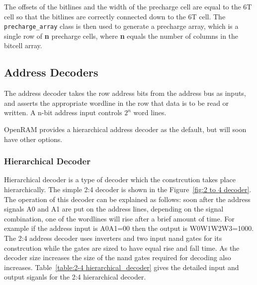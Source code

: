 The offsets of the bitlines and the width of the precharge cell are
equal to the 6T cell so that the bitlines are correctly connected down
to the 6T cell.  The \verb|precharge_array| class is then used to
generate a precharge array, which is a single row of \textbf{n}
precharge cells, where \textbf{n} equals the number of columns in the
bitcell array.


\subsection{Address Decoders}
\label{sec:addressdecoder}

The address decoder takes the row address bits from the address bus as
inputs, and asserts the appropriate wordline in the row that data is
to be read or written.  A n-bit address input controls $2^n$ word
lines. 

OpenRAM provides a hierarchical address decoder as the default, but
will soon have other options.

\subsubsection{Hierarchical Decoder}
\label{sec:hierdecoder}

Hierarchical decoder is a type of decoder which the constrcution takes place hierarchically. 
The simple 2:4 decoder is shown in the Figure~\ref{fig:2 to 4 decoder}. The operation of
this decoder can be explained as follows: soon after the address signals A0 and A1 are put on the address lines, 
depending on the signal combination, one of the wordlines will rise after a brief amount of time. For example if the
address input is A0A1=00 then the output is W0W1W2W3=1000. The 2:4 address decoder uses inverters and two 
input nand gates for its constrcution while the gates are sized to have equal rise and fall time.
As the decoder size increases the size of the nand gates required for decoding also increases.
Table~\ref{table:2-4 hierarchical_decoder} gives the detailed input and output siganls
for the 2:4 hierarchical decoder. 


